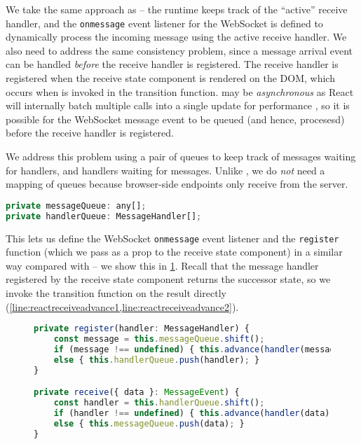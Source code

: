 We take the same approach as  --
the runtime keeps track of the ``active'' receive handler,
and the \texttt{onmessage} event listener for the WebSocket
is defined to dynamically process the incoming message
using the active receive handler.
We also need to address the same consistency problem, since
a message arrival event can be handled \textit{before}
the receive handler is registered.
The receive handler is registered when the receive state component
is rendered on the DOM, which occurs when 
is invoked in the transition function.
 may be \textit{asynchronous}
as React will internally batch multiple calls into a single update
for performance \cite{ReactState}, so it is possible for the WebSocket message
event to be queued (and hence, procesesd) before the receive handler
is registered.

We address this problem using a pair of queues to keep track
of messages waiting for handlers, and handlers waiting for messages.
Unlike , we do \textit{not} need a mapping
of queues because browser-side endpoints only receive from the server.

\begin{lstlisting}[language=javascript,numbers=none]
private messageQueue: any[];
private handlerQueue: MessageHandler[];
\end{lstlisting}

This lets us define the WebSocket \texttt{onmessage} event
listener and the \texttt{register} function (which we pass as a prop
to the receive state component) in a similar way compared with
 -- we show this in \cref{lst:reactreceiveruntime}.
Recall that the message handler registered
by the receive state component returns the successor state,
so we invoke the transition function on the result directly 
(\cref{line:reactreceiveadvance1,line:reactreceiveadvance2}).

\begin{figure}[!h]
\begin{lstlisting}[language=javascript]
private register(handler: MessageHandler) {
	const message = this.messageQueue.shift();
	if (message !== undefined) { this.advance(handler(message)); } (*@\label{line:reactreceiveadvance1}@*)
	else { this.handlerQueue.push(handler); }
}

private receive({ data }: MessageEvent) {
	const handler = this.handlerQueue.shift();
	if (handler !== undefined) { this.advance(handler(data); } (*@\label{line:reactreceiveadvance2}@*)
	else { this.messageQueue.push(data); }
}
\end{lstlisting}
\label{lst:reactreceiveruntime}
\end{figure}

